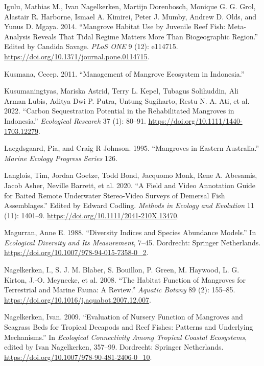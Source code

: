 \documentclass[
]{article}
\newlength{\cslhangindent}
\newenvironment{CSLReferences}[2] %
 {\begin{list}{}{%
  \setlength{\itemindent}{0pt}
  \setlength{\leftmargin}{0pt}
  \setlength{\parsep}{0pt}
  \ifodd #1
   \setlength{\leftmargin}{\cslhangindent}
   \setlength{\itemindent}{-1\cslhangindent}
  \fi
  \setlength{\itemsep}{#2\baselineskip}}}
 {\end{list}}
\begin{document}
\begin{CSLReferences}{1}{0}
Igulu, Mathias M., Ivan Nagelkerken, Martijn Dorenbosch, Monique G. G. Grol, Alastair R. Harborne, Ismael A. Kimirei, Peter J. Mumby, Andrew D. Olds, and Yunus D. Mgaya. 2014. {``Mangrove {Habitat Use} by {Juvenile Reef Fish}: {Meta-Analysis Reveals} That {Tidal Regime Matters More} Than {Biogeographic Region}.''} Edited by Candida Savage. \emph{PLoS ONE} 9 (12): e114715. \url{https://doi.org/10.1371/journal.pone.0114715}.

Kusmana, Cecep. 2011. {``Management of Mangrove Ecosystem in {Indonesia}.''}

Kusumaningtyas, Mariska Astrid, Terry L. Kepel, Tubagus Solihuddin, Ali Arman Lubis, Aditya Dwi P. Putra, Untung Sugiharto, Restu N. A. Ati, et al. 2022. {``Carbon Sequestration Potential in the Rehabilitated Mangroves in {Indonesia}.''} \emph{Ecological Research} 37 (1): 80--91. \url{https://doi.org/10.1111/1440-1703.12279}.

Laegdsgaard, Pia, and Craig R Johnson. 1995. {``Mangroves in Eastern {Australia}.''} \emph{Marine Ecology Progress Series} 126.

Langlois, Tim, Jordan Goetze, Todd Bond, Jacquomo Monk, Rene A. Abesamis, Jacob Asher, Neville Barrett, et al. 2020. {``A Field and Video Annotation Guide for Baited Remote Underwater Stereo-Video Surveys of Demersal Fish Assemblages.''} Edited by Edward Codling. \emph{Methods in Ecology and Evolution} 11 (11): 1401--9. \url{https://doi.org/10.1111/2041-210X.13470}.

Magurran, Anne E. 1988. {``Diversity Indices and Species Abundance Models.''} In \emph{Ecological {Diversity} and {Its Measurement}}, 7--45. Dordrecht: Springer Netherlands. \url{https://doi.org/10.1007/978-94-015-7358-0_2}.

Nagelkerken, I., S. J. M. Blaber, S. Bouillon, P. Green, M. Haywood, L. G. Kirton, J.-O. Meynecke, et al. 2008. {``The Habitat Function of Mangroves for Terrestrial and Marine Fauna: {A} Review.''} \emph{Aquatic Botany} 89 (2): 155--85. \url{https://doi.org/10.1016/j.aquabot.2007.12.007}.

Nagelkerken, Ivan. 2009. {``Evaluation of {Nursery} Function of {Mangroves} and {Seagrass} Beds for {Tropical Decapods} and {Reef} Fishes: {Patterns} and {Underlying Mechanisms}.''} In \emph{Ecological {Connectivity} Among {Tropical Coastal Ecosystems}}, edited by Ivan Nagelkerken, 357--99. Dordrecht: Springer Netherlands. \url{https://doi.org/10.1007/978-90-481-2406-0_10}.


\end{CSLReferences}
\end{document}
